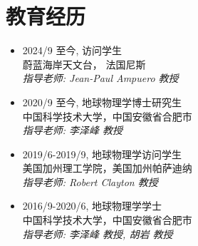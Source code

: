 \section{教育经历}

\begin{itemize}

  \item 2024/9 至今, 访问学生 \\
  蔚蓝海岸天文台， 法国尼斯 \\
  \textit{指导老师: Jean-Paul Ampuero 教授}

  \item 2020/9 至今, 地球物理学博士研究生 \\
  中国科学技术大学，中国安徽省合肥市 \\
        \textit{指导老师: 李泽峰 教授}

  \item 2019/6-2019/9, 地球物理学访问学生 \\
        美国加州理工学院，美国加州帕萨迪纳 \\
        \textit{指导老师: Robert Clayton 教授}

    \item 2016/9-2020/6, 地球物理学学士 \\
        中国科学技术大学，中国安徽省合肥市 \\
        \textit{指导老师: 李泽峰 教授, 胡岩 教授}

\end{itemize}
